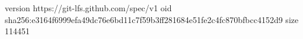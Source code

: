 version https://git-lfs.github.com/spec/v1
oid sha256:e3164f6999efa49dc76e6bd11c7f59b3ff281684e51fe2c4fc870bfbcc4152d9
size 114451
